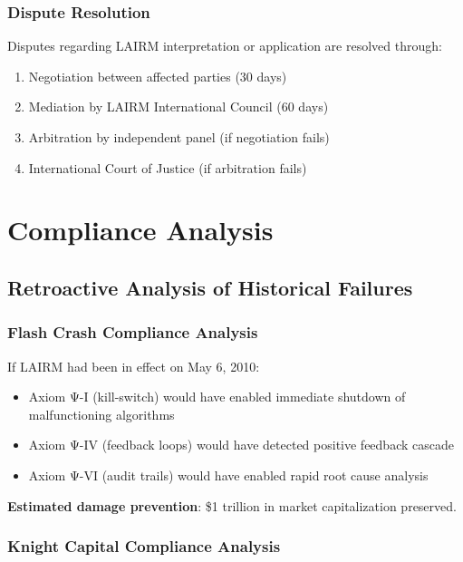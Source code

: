 \documentclass[12pt,a4paper,twoside,openright]{book}
\begin{document}
\subsection{Dispute Resolution}

Disputes regarding LAIRM interpretation or application are resolved through:

\begin{enumerate}
    \item Negotiation between affected parties (30 days)
    \item Mediation by LAIRM International Council (60 days)
    \item Arbitration by independent panel (if negotiation fails)
    \item International Court of Justice (if arbitration fails)
\end{enumerate}

\chapter{Compliance Analysis}
\label{ch:compliance}

\section{Retroactive Analysis of Historical Failures}

\subsection{Flash Crash Compliance Analysis}

If LAIRM had been in effect on May 6, 2010:

\begin{itemize}
    \item Axiom Ψ-I (kill-switch) would have enabled immediate shutdown of malfunctioning algorithms
    \item Axiom Ψ-IV (feedback loops) would have detected positive feedback cascade
    \item Axiom Ψ-VI (audit trails) would have enabled rapid root cause analysis
\end{itemize}

\textbf{Estimated damage prevention}: \$1 trillion in market capitalization preserved.

\subsection{Knight Capital Compliance Analysis}
\end{document}
